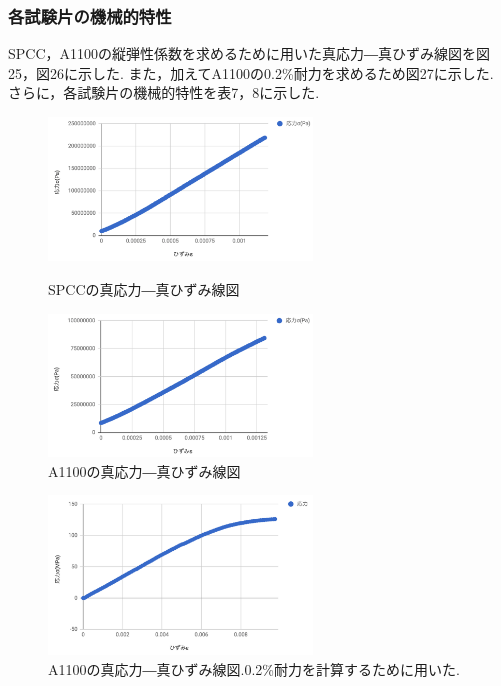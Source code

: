 \documentclass[10pt，a4j]{jsarticle}
\begin{document}
  \subsubsection{各試験片の機械的特性}
    SPCC，A1100の縦弾性係数を求めるために用いた真応力―真ひずみ線図を図25，図26に示した.
    また，加えてA1100の0.2\%耐力を求めるため図27に示した.
    さらに，各試験片の機械的特性を表7，8に示した.
      \begin{figure}[htbp]
        \begin{minipage}{0.5\hsize}
          \begin{center}
            \includegraphics[width=7cm]{../img/spcc_yangu.png}
            \caption{SPCCの真応力―真ひずみ線図}
          \end{center}
        \end{minipage}
        \begin{minipage}{0.5\hsize}
          \begin{center}
            \includegraphics[width=7cm]{../img/a1100_yangu.png}
            \caption{A1100の真応力―真ひずみ線図}
          \end{center}
        \end{minipage}
      \end{figure}
      \begin{figure}[H]
        \begin{center}
          \includegraphics[width=7cm]{../img/zeroni.png}
          \caption{A1100の真応力―真ひずみ線図.0.2\%耐力を計算するために用いた.}
        \end{center}
      \end{figure}
\end{document}
